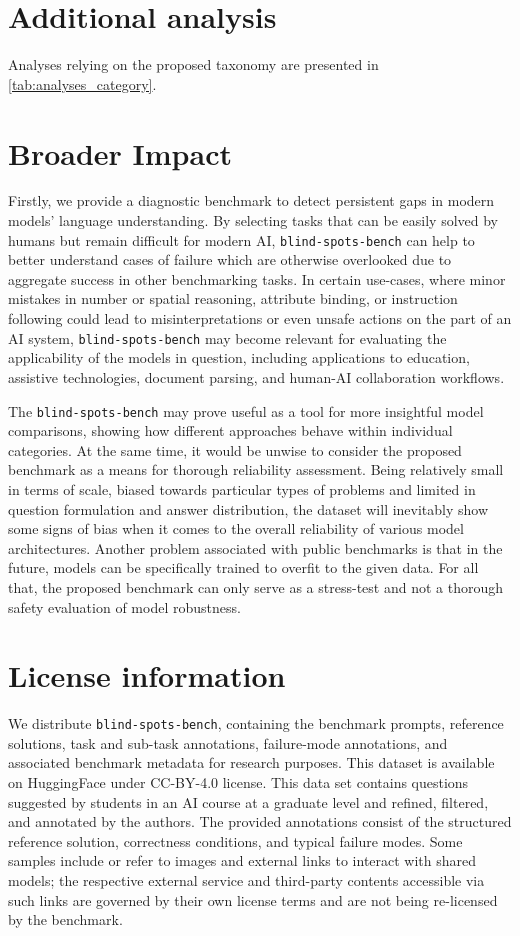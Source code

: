 \documentclass{article}
\newcommand{\bench}{\texttt{blind-spots-bench}\xspace}    %
\begin{document}
\section{Additional analysis}
Analyses relying on the proposed taxonomy are presented in \autoref{tab:analyses_category}.


\section{Broader Impact}
\label{appendix:broader_impact}
Firstly, we provide a diagnostic benchmark to detect persistent gaps in modern models' language understanding. By selecting tasks that can be easily solved by humans but remain difficult for modern AI, \bench can help to better understand cases of failure which are otherwise overlooked due to aggregate success in other benchmarking tasks. In certain use-cases, where minor mistakes in number or spatial reasoning, attribute binding, or instruction following could lead to misinterpretations or even unsafe actions on the part of an AI system, \bench may become relevant for evaluating the applicability of the models in question, including applications to education, assistive technologies, document parsing, and human-AI collaboration workflows.

The \bench may prove useful as a tool for more insightful model comparisons, showing how different approaches behave within individual categories. At the same time, it would be unwise to consider the proposed benchmark as a means for thorough reliability assessment. Being relatively small in terms of scale, biased towards particular types of problems and limited in question formulation and answer distribution, the dataset will inevitably show some signs of bias when it comes to the overall reliability of various model architectures. Another problem associated with public benchmarks is that in the future, models can be specifically trained to overfit to the given data. For all that, the proposed benchmark can only serve as a stress-test and not a thorough safety evaluation of model robustness.

\section{License information}
We distribute \bench, containing the benchmark prompts, reference solutions, task and sub-task annotations, failure-mode annotations, and associated benchmark metadata for research purposes. This dataset is available on HuggingFace under CC-BY-4.0 license. This data set contains questions suggested by students in an AI course at a graduate level and refined, filtered, and annotated by the authors. The provided annotations consist of the structured reference solution, correctness conditions, and typical failure modes. Some samples include or refer to images and external links to interact with shared models; the respective external service and third-party contents accessible via such links are governed by their own license terms and are not being re-licensed by the benchmark.
\end{document}

